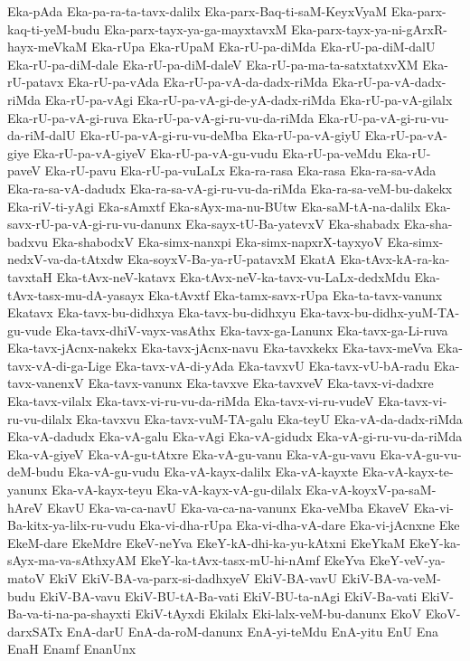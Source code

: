 {Eka-pAda
Eka-pa-ra-ta-tavx-dalilx
Eka-parx-Baq-ti-saM-KeyxVyaM
Eka-parx-kaq-ti-yeM-budu
Eka-parx-tayx-ya-ga-mayxtavxM
Eka-parx-tayx-ya-ni-gArxR-hayx-meVkaM
Eka-rUpa
Eka-rUpaM
Eka-rU-pa-diMda
Eka-rU-pa-diM-dalU
Eka-rU-pa-diM-dale
Eka-rU-pa-diM-daleV
Eka-rU-pa-ma-ta-satxtatxvXM
Eka-rU-patavx
Eka-rU-pa-vAda
Eka-rU-pa-vA-da-dadx-riMda
Eka-rU-pa-vA-dadx-riMda
Eka-rU-pa-vAgi
Eka-rU-pa-vA-gi-de-yA-dadx-riMda
Eka-rU-pa-vA-gilalx
Eka-rU-pa-vA-gi-ruva
Eka-rU-pa-vA-gi-ru-vu-da-riMda
Eka-rU-pa-vA-gi-ru-vu-da-riM-dalU
Eka-rU-pa-vA-gi-ru-vu-deMba
Eka-rU-pa-vA-giyU
Eka-rU-pa-vA-giye
Eka-rU-pa-vA-giyeV
Eka-rU-pa-vA-gu-vudu
Eka-rU-pa-veMdu
Eka-rU-paveV
Eka-rU-pavu
Eka-rU-pa-vuLaLx
Eka-ra-rasa
Eka-rasa
Eka-ra-sa-vAda
Eka-ra-sa-vA-dadudx
Eka-ra-sa-vA-gi-ru-vu-da-riMda
Eka-ra-sa-veM-bu-dakekx
Eka-riV-ti-yAgi
Eka-sAmxtf
Eka-sAyx-ma-nu-BUtw
Eka-saM-tA-na-dalilx
Eka-savx-rU-pa-vA-gi-ru-vu-danunx
Eka-sayx-tU-Ba-yatevxV
Eka-shabadx
Eka-sha-badxvu
Eka-shabodxV
Eka-simx-nanxpi
Eka-simx-napxrX-tayxyoV
Eka-simx-nedxV-va-da-tAtxdw
Eka-soyxV-Ba-ya-rU-patavxM
EkatA
Eka-tAvx-kA-ra-ka-tavxtaH
Eka-tAvx-neV-katavx
Eka-tAvx-neV-ka-tavx-vu-LaLx-dedxMdu
Eka-tAvx-tasx-mu-dA-yasayx
Eka-tAvxtf
Eka-tamx-savx-rUpa
Eka-ta-tavx-vanunx
Ekatavx
Eka-tavx-bu-didhxya
Eka-tavx-bu-didhxyu
Eka-tavx-bu-didhx-yuM-TA-gu-vude
Eka-tavx-dhiV-vayx-vasAthx
Eka-tavx-ga-Lanunx
Eka-tavx-ga-Li-ruva
Eka-tavx-jAcnx-nakekx
Eka-tavx-jAcnx-navu
Eka-tavxkekx
Eka-tavx-meVva
Eka-tavx-vA-di-ga-Lige
Eka-tavx-vA-di-yAda
Eka-tavxvU
Eka-tavx-vU-bA-radu
Eka-tavx-vanenxV
Eka-tavx-vanunx
Eka-tavxve
Eka-tavxveV
Eka-tavx-vi-dadxre
Eka-tavx-vilalx
Eka-tavx-vi-ru-vu-da-riMda
Eka-tavx-vi-ru-vudeV
Eka-tavx-vi-ru-vu-dilalx
Eka-tavxvu
Eka-tavx-vuM-TA-galu
Eka-teyU
Eka-vA-da-dadx-riMda
Eka-vA-dadudx
Eka-vA-galu
Eka-vAgi
Eka-vA-gidudx
Eka-vA-gi-ru-vu-da-riMda
Eka-vA-giyeV
Eka-vA-gu-tAtxre
Eka-vA-gu-vanu
Eka-vA-gu-vavu
Eka-vA-gu-vu-deM-budu
Eka-vA-gu-vudu
Eka-vA-kayx-dalilx
Eka-vA-kayxte
Eka-vA-kayx-te-yanunx
Eka-vA-kayx-teyu
Eka-vA-kayx-vA-gu-dilalx
Eka-vA-koyxV-pa-saM-hAreV
EkavU
Eka-va-ca-navU
Eka-va-ca-na-vanunx
Eka-veMba
EkaveV
Eka-vi-Ba-kitx-ya-lilx-ru-vudu
Eka-vi-dha-rUpa
Eka-vi-dha-vA-dare
Eka-vi-jAcnxne
Eke
EkeM-dare
EkeMdre
EkeV-neYva
EkeY-kA-dhi-ka-yu-kAtxni
EkeYkaM
EkeY-ka-sAyx-ma-va-sAthxyAM
EkeY-ka-tAvx-tasx-mU-hi-nAmf
EkeYva
EkeY-veV-ya-matoV
EkiV
EkiV-BA-va-parx-si-dadhxyeV
EkiV-BA-vavU
EkiV-BA-va-veM-budu
EkiV-BA-vavu
EkiV-BU-tA-Ba-vati
EkiV-BU-ta-nAgi
EkiV-Ba-vati
EkiV-Ba-va-ti-na-pa-shayxti
EkiV-tAyxdi
Ekilalx
Eki-lalx-veM-bu-danunx
EkoV
EkoV-darxSATx
EnA-darU
EnA-da-roM-danunx
EnA-yi-teMdu
EnA-yitu
EnU
Ena
EnaH
Enamf
EnanUnx
}
